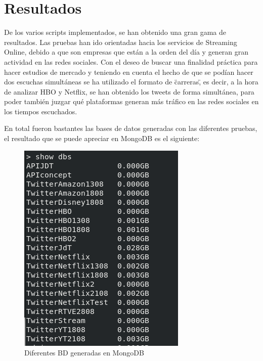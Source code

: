 
\chapter{Resultados}

De los varios scripts implementados, se han obtenido una gran gama de resultados. Las pruebas han ido orientadas hacia los servicios de Streaming Online, debido a que son empresas que están a la orden del día y generan gran actividad en las redes sociales. Con el deseo de buscar una finalidad práctica para hacer estudios de mercado y teniendo en cuenta el hecho de que se podían hacer dos escuchas simultáneas se ha utilizado el formato de \"carreras\", es decir, a la hora de analizar HBO y Netflix, se han obtenido los tweets de forma simultánea, para poder también juzgar qué plataformas generan más tráfico en las redes sociales en los tiempos escuchados. 

En total fueron bastantes las bases de datos generadas con las diferentes pruebas, el resultado que se puede apreciar en MongoDB es el siguiente:


\begin{figure}[H]
	\centering
	\includegraphics[scale=.6]{imagenes/BD-Mongo.png}
	\caption{Diferentes BD generadas en MongoDB}
	\label{fig:BD-MongoDB}
\end{figure}


